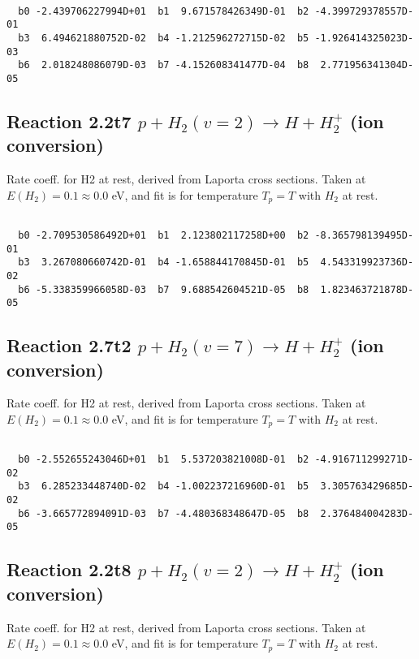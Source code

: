 \begin{small}\begin{verbatim}

  b0 -2.439706227994D+01  b1  9.671578426349D-01  b2 -4.399729378557D-01
  b3  6.494621880752D-02  b4 -1.212596272715D-02  b5 -1.926414325023D-03
  b6  2.018248086079D-03  b7 -4.152608341477D-04  b8  2.771956341304D-05

\end{verbatim}\end{small}

\newpage
\subsection{
Reaction 2.2t7
$ p + H_2(v=2) \rightarrow H + H_2^+$ (ion conversion)
}
Rate coeff. for H2 at rest, derived from Laporta cross sections.
Taken at $E(H_2) = 0.1 \approx 0.0$ eV,  and fit is for temperature $T_p=T$ with $H_2$ at rest.

\begin{small}\begin{verbatim}

  b0 -2.709530586492D+01  b1  2.123802117258D+00  b2 -8.365798139495D-01
  b3  3.267080660742D-01  b4 -1.658844170845D-01  b5  4.543319923736D-02
  b6 -5.338359966058D-03  b7  9.688542604521D-05  b8  1.823463721878D-05

\end{verbatim}\end{small}

\newpage
\subsection{
Reaction 2.7t2
$ p + H_2(v=7) \rightarrow H + H_2^+$ (ion conversion)
}
Rate coeff. for H2 at rest, derived from Laporta cross sections.
Taken at $E(H_2) = 0.1 \approx 0.0$ eV,  and fit is for temperature $T_p=T$ with $H_2$ at rest.

\begin{small}\begin{verbatim}

  b0 -2.552655243046D+01  b1  5.537203821008D-01  b2 -4.916711299271D-02
  b3  6.285233448740D-02  b4 -1.002237216960D-01  b5  3.305763429685D-02
  b6 -3.665772894091D-03  b7 -4.480368348647D-05  b8  2.376484004283D-05

\end{verbatim}\end{small}

\newpage
\subsection{
Reaction 2.2t8
$ p + H_2(v=2) \rightarrow H + H_2^+$ (ion conversion)
}
Rate coeff. for H2 at rest, derived from Laporta cross sections.
Taken at $E(H_2) = 0.1 \approx 0.0$ eV,  and fit is for temperature $T_p=T$ with $H_2$ at rest.

